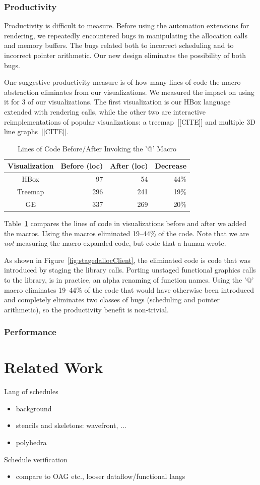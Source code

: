 \subsubsection{Productivity}
Productivity is difficult to measure. Before using the automation extensions for rendering, we repeatedly encountered bugs in manipulating the allocation calls and memory buffers. The bugs related both to incorrect scheduling and to incorrect pointer arithmetic. Our new design eliminates the possibility of both bugs.

One suggestive productivity measure is of how many lines of code the macro abstraction eliminates from our visualizations. We measured the impact on using it for 3 of our visualizations. The first visualization is our HBox language extended with rendering calls, while the other two are interactive reimplementations of popular visualizations: a treemap~[[CITE]] and multiple 3D line graphs~[[CITE]].


\begin{table}[ht]
\caption{Lines of Code Before/After Invoking the '@' Macro}
\centering
\begin{tabular}{c r r r}
\hline\hline
 \textbf{Visualization} & \textbf{Before (loc)} & \textbf{After (loc)} & \textbf{Decrease} \\ [0.5ex] \hline
  HBox & 97 & 54 & 44\% \\
  Treemap & 296 & 241 & 19\% \\
  GE & 337 & 269 & 20\% \\ [1ex] 
\hline
\end{tabular}
\label{table:macroreduction}
\end{table}
Table~\ref{table:macroreduction} compares the lines of code in visualizations before and after we added the macros. Using the macros eliminated 19--44\% of the code. Note that we are \emph{not} measuring the macro-expanded code, but code that a human wrote.



As shown in Figure~\ref{fig:stagedallocClient}, the eliminated code is code that was introduced by staging the library calls. Porting unstaged functional graphics calls to the library, is in practice, an alpha renaming of function names.  Using the '@' macro eliminates 19--44\% of the code that would have otherwise been introduced and completely eliminates two classes of bugs (scheduling and pointer arithmetic), so the productivity benefit is non-trivial. 

\subsubsection{Performance}


\section{Related Work}
Lang of schedules
\begin{itemize}
\item background
\item stencils and skeletons: wavefront, ...
\item polyhedra
\end{itemize}
Schedule verification
\begin{itemize}
\item compare to OAG etc., looser dataflow/functional langs
\end{itemize}